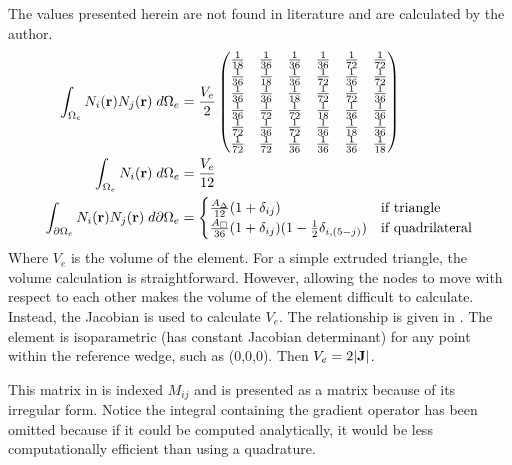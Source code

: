       The values presented herein are not found in literature and are 
      calculated by the author.
      \begin{align}
        \label{eq:bigmat}
        \int_{\Omega_e} N_i(\mathbf{r}) N_j(\mathbf{r}) \;d\Omega_e &= 
          \frac{V_e}{2}
          \begin{pmatrix}
            \frac{1}{18} & \frac{1}{36} & \frac{1}{36} & \frac{1}{36} & 
              \frac{1}{72} & \frac{1}{72} \\
            \frac{1}{36} & \frac{1}{18} & \frac{1}{36} & \frac{1}{72} & 
              \frac{1}{36} & \frac{1}{72} \\
            \frac{1}{36} & \frac{1}{36} & \frac{1}{18} & \frac{1}{72} & 
              \frac{1}{72} & \frac{1}{36} \\
            \frac{1}{36} & \frac{1}{72} & \frac{1}{72} & \frac{1}{18} & 
              \frac{1}{36} & \frac{1}{36} \\
            \frac{1}{72} & \frac{1}{36} & \frac{1}{72} & \frac{1}{36} & 
              \frac{1}{18} & \frac{1}{36} \\
            \frac{1}{72} & \frac{1}{72} & \frac{1}{36} & \frac{1}{36} & 
              \frac{1}{36} & \frac{1}{18} 
          \end{pmatrix} \\
        \int_{\Omega_e} N_i(\mathbf{r}) \;d\Omega_e &= \frac{V_e}{12} \\
        \int_{\partial \Omega_e} N_i(\mathbf{r}) 
          N_j(\mathbf{r}) \;d\partial\Omega_e &= 
          \begin{cases}
            \frac{A_{\Delta}}{12}(1+\delta_{ij}) & \text{if triangle} \\
            \frac{A_{\Box}}{36}(1+\delta_{ij})(1-\frac{1}{2} \delta_{i,(5-j)}) &
              \text{if quadrilateral}
          \end{cases}
      \end{align}
      Where $V_e$ is the volume of the element. For a simple extruded triangle,
      the volume calculation is straightforward. However, allowing the nodes to
      move with respect to each other makes the volume of the element difficult
      to calculate. Instead, the Jacobian is used to calculate $V_e$. The
      relationship is given in . The element is isoparametric
      (has constant Jacobian determinant) for any point within the reference
      wedge, such as (0,0,0). Then $V_e = 2 \lvert \mathbf{J} \rvert$.
      
      This matrix in  is indexed $M_{ij}$
      and is presented as a matrix because of its irregular form. Notice the 
      integral containing the gradient operator has been omitted because if 
      it could be computed analytically, it would be less computationally 
      efficient than using a quadrature.
